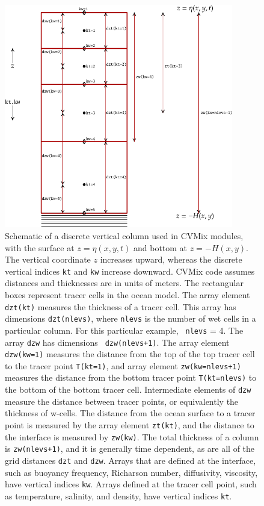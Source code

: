 \begin{figure}[h!t]
\begin{center}
\includegraphics[angle=0,width=10cm,bb=0 0 316 309]{./mfpic_figs/cvmix_discrete_vertical.pdf}
\caption[Discrete vertical column for CVMix modules]{\sf Schematic of
  a discrete vertical column used in CVMix modules, with the surface
  at $z=\eta(x,y,t)$ and bottom at $z=-H(x,y)$.  The vertical
  coordinate $z$ increases upward, whereas the discrete vertical
  indices {\tt kt} and {\tt kw} increase downward.  CVMix code assumes
  distances and thicknesses are in units of meters. The rectangular
  boxes represent tracer cells in the ocean model.  The array element
  {\tt dzt(kt)} measures the thickness of a tracer cell. This array
  has dimensions {\tt dzt(nlevs)}, where {\tt nlevs} is the number of
  wet cells in a particular column.  For this particular example, {\tt
    nlevs} = 4.  The array {\tt dzw} has dimensions {\tt
    dzw(nlevs+1)}.  The array element {\tt dzw(kw=1)} measures the
  distance from the top of the top tracer cell to the tracer point
  {\tt T(kt=1)}, and array element {\tt zw(kw=nlevs+1)} measures the
  distance from the bottom tracer point {\tt T(kt=nlevs)} to the bottom
  of the bottom tracer cell.  Intermediate elements of {\tt dzw}
  measure the distance between tracer points, or equivalently the
  thickness of w-cells.  The distance from the ocean surface to a
  tracer point is measured by the array element {\tt zt(kt)}, and the
  distance to the interface is measured by {\tt zw(kw)}.  The total
  thickness of a column is {\tt zw(nlevs+1)}, and it is generally time
  dependent, as are all of the grid distances {\tt dzt} and {\tt dzw}.
  Arrays that are defined at the interface, such as buoyancy
  frequency, Richarson number, diffusivity, viscosity, have vertical
  indices {\tt kw}.  Arrays defined at the tracer cell point, such as
  temperature, salinity, and density, have vertical indices {\tt kt}.}
\label{fig:cvmix_discrete_vertical}
\end{center}
\end{figure}



